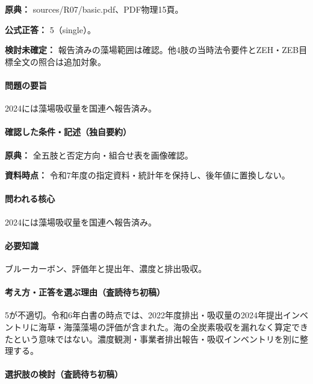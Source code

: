 \noindent\textbf{原典：} sources/R07/basic.pdf、PDF物理15頁。

\textbf{公式正答：} 5（single）。

\par\textbf{検討未確定：} 報告済みの藻場範囲は確認。他4肢の当時法令要件とZEH・ZEB目標全文の照合は追加対象。

\paragraph{問題の要旨} 2024には藻場吸収量を国連へ報告済み。

\paragraph{確認した条件・記述（独自要約）}\mbox{}\par

\noindent\textbf{原典：} 全五肢と否定方向・組合せ表を画像確認。\par

\noindent\textbf{資料時点：} 令和7年度の指定資料・統計年を保持し、後年値に置換しない。\par

\paragraph{問われる核心} 2024には藻場吸収量を国連へ報告済み。

\paragraph{必要知識} ブルーカーボン、評価年と提出年、濃度と排出吸収。

\paragraph{考え方・正答を選ぶ理由（査読待ち初稿）} 5が不適切。令和6年白書の時点では、2022年度排出・吸収量の2024年提出インベントリに海草・海藻藻場の評価が含まれた。海の全炭素吸収を漏れなく算定できたという意味ではない。濃度観測・事業者排出報告・吸収インベントリを別に整理する。

\paragraph{選択肢の検討（査読待ち初稿）}\mbox{}\par

